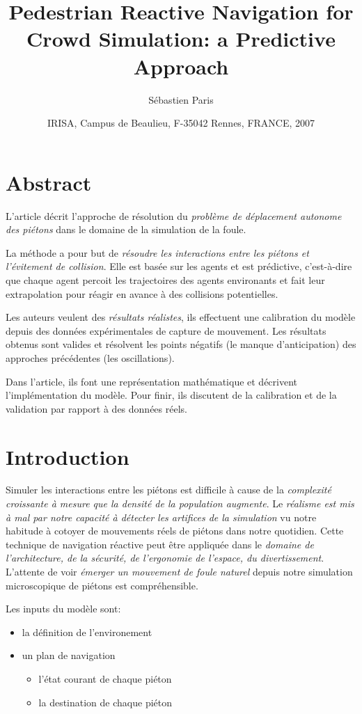 \documentclass[11pt]{article}
\title{Pedestrian Reactive Navigation for Crowd Simulation: a Predictive Approach}
\author{Sébastien Paris}
\date{IRISA, Campus de Beaulieu, F-35042 Rennes, FRANCE, 2007}
\begin{document}
\maketitle

\section*{Abstract}

L'article décrit l'approche de résolution du \textit{problème de déplacement autonome des piétons} dans le domaine de la simulation de la foule. 

La méthode a pour but de \textit{résoudre les interactions entre les piétons et l'évitement de collision}. Elle est basée sur les agents et est prédictive, c'est-à-dire que chaque agent percoit les trajectoires des agents environants et fait leur extrapolation  pour réagir en avance à des collisions potentielles. 

Les auteurs veulent des \textit{résultats réalistes}, ils effectuent une calibration du modèle depuis des données expérimentales de capture de mouvement. Les résultats obtenus sont valides et résolvent les points négatifs (le manque d'anticipation) des approches précédentes (les oscillations).

Dans l'article, ils font une représentation mathématique et décrivent l'implémentation du modèle. Pour finir, ils discutent de la calibration et de la validation par rapport à des données réels.

\section{Introduction}

Simuler les interactions entre les piétons est difficile à cause de la \textit{complexité croissante à mesure que la densité de la population augmente}. Le \textit{réalisme est mis à mal par notre capacité à détecter les artifices de la simulation} vu notre habitude à cotoyer de mouvements réels de piétons dans notre quotidien.
Cette technique de navigation réactive peut être appliquée dans le \textit{domaine de l'architecture, de la sécurité, de l'ergonomie de l'espace, du divertissement}.
L'attente de voir \textit{émerger un mouvement de foule naturel} depuis notre simulation microscopique de piétons est compréhensible. 

Les inputs du modèle sont:
\begin{itemize}
	\item la définition de l'environement
	\item un plan de navigation
		\begin{itemize}
			\item l'état courant de chaque piéton
			\item la destination de chaque piéton\newline
		\end{itemize}
\end{itemize}
\end{document}
